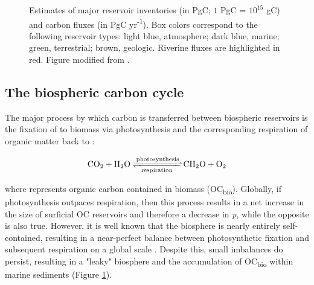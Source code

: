 \begin{figure}[h]
	\caption[Carbon cycle reservoir inventories and fluxes]{Estimates of major reservoir inventories (in PgC; $1$ PgC = $10^{15}$ gC) and carbon fluxes (in PgC yr\textsuperscript{-1}). Box colors correspond to the following reservoir types: light blue, atmosphere; dark blue, marine; green, terrestrial; brown, geologic. Riverine fluxes are highlighted in red. Figure modified from \citet{Bianchi:2011cu}.}
	\label{Ch1Fig:1}
\end{figure}

\subsection{The biospheric carbon cycle}

The major process by which carbon is transferred between biospheric reservoirs is the fixation of  to biomass via photosynthesis and the corresponding respiration of organic matter back to :

\begin{equation}\label{Ch1Eq:1}
	\ce{CO2 + H2O <=>[{photosynthesis}][{respiration}] CH2O + O2}
\end{equation}

where  represents organic carbon contained in biomass (OC\textsubscript{bio}). Globally, if photosynthesis outpaces respiration, then this process results in a net increase in the size of surficial OC reservoirs and therefore a decrease in \textit{p}, while the opposite is also true. However, it is well known that the biosphere is nearly entirely self-contained, resulting in a near-perfect balance between photosynthetic  fixation and subsequent respiration on a global scale \citep{Sarmiento:2006wz}. Despite this, small imbalances do persist, resulting in a "leaky" biosphere and the accumulation of OC\textsubscript{bio} within marine sediments (Figure \ref{Ch1Fig:1}).

